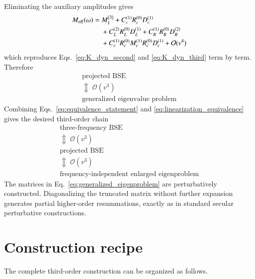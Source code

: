 \documentclass[aip,jcp,reprint,noshowkeys,superscriptaddress]{revtex4-1}
\begin{document}
Eliminating the auxiliary amplitudes gives
\begin{equation}
	\begin{split}
	M_{\rm eff}(\omega)
	={}&
	M_1^{[3]}
	+
	C_c^{(1)}R_c^{(0)}D_c^{(1)}
	\\
	&+
	C_L^{(2)}R_L^{(0)}D_L^{(1)}
	+
	C_R^{(1)}R_R^{(0)}D_R^{(2)}
	\\
	&+
	C_c^{(1)}R_c^{(0)}M_c^{(1)}R_c^{(0)}D_c^{(1)}
	+
	\mathcal O(v^4)
	\end{split}
	\label{eq:Schur_effective}
\end{equation}
which reproduces Eqs.~\eqref{eq:K_dyn_second} and \eqref{eq:K_dyn_third} term by term.
Therefore
\begin{equation}
	\begin{array}{c}
	\text{projected BSE}
	\\[-1mm]
	\Updownarrow\;\mathcal O(v^3)
	\\[-1mm]
	\text{generalized eigenvalue problem}
	\end{array}
	\label{eq:linearization_equivalence}
\end{equation}
Combining Eqs.~\eqref{eq:equivalence_statement} and \eqref{eq:linearization_equivalence} gives the desired third-order chain
\begin{equation}
	\begin{array}{c}
	\text{three-frequency BSE}
	\\[-1mm]
	\Updownarrow\;\mathcal O(v^3)
	\\[-1mm]
	\text{projected BSE}
	\\[-1mm]
	\Updownarrow\;\mathcal O(v^3)
	\\[-1mm]
	\text{frequency-independent enlarged eigenproblem}
	\end{array}
	\label{eq:full_chain}
\end{equation}
The matrices in Eq.~\eqref{eq:generalized_eigenproblem} are perturbatively constructed.
Diagonalizing the truncated matrix without further expansion generates partial higher-order resummations, exactly as in standard secular perturbative constructions.

\section{Construction recipe}
\label{sec:recipe}

The complete third-order construction can be organized as follows.
\end{document}
